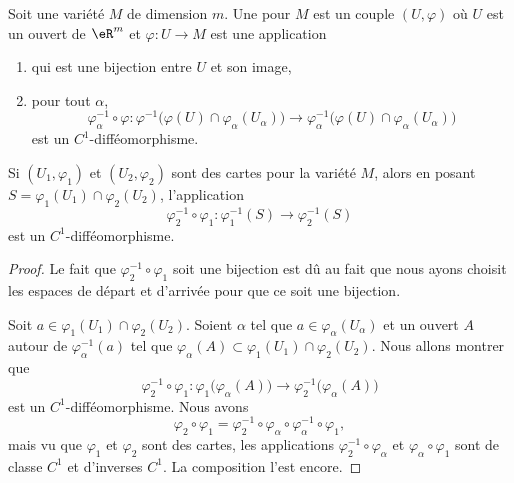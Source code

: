 \begin{definition}      \label{DEFooWABZooGIEDEV}
    Soit une variété \( M\) de dimension \( m\). Une  pour \( M\) est un couple \( (U,\varphi)\) où \( U\) est un ouvert de \( \eR^m\) et \( \varphi\colon U\to M\) est une application
    \begin{enumerate}
        \item
            qui est une bijection entre \( U\) et son image,
        \item
    pour tout \( \alpha\),
    \begin{equation}
        \varphi_{\alpha}^{-1}\circ \varphi\colon \varphi^{-1}\big( \varphi(U)\cap\varphi_{\alpha}(U_{\alpha}) \big)\to \varphi_{\alpha}^{-1}\big( \varphi(U)\cap\varphi_{\alpha}(U_{\alpha}) \big)
    \end{equation}
    est un \( C^1\)-difféomorphisme.
    \end{enumerate}
\end{definition}

\begin{proposition}
    Si \( (U_1,\varphi_1)\) et \( (U_2,\varphi_2)\) sont des cartes pour la variété \( M\), alors en posant \( S=\varphi_1(U_1)\cap \varphi_2(U_2)\), l'application
    \begin{equation}
        \varphi_2^{-1}\circ\varphi_1\colon \varphi_1^{-1}(S)\to \varphi_2^{-1}(S)
    \end{equation}
    est un \( C^1\)-difféomorphisme.
\end{proposition}

\begin{proof}
    Le fait que \( \varphi_2^{-1}\circ\varphi_1\) soit une bijection est dû au fait que nous ayons choisit les espaces de départ et d'arrivée pour que ce soit une bijection.

    Soit \( a\in \varphi_1(U_1)\cap\varphi_2(U_2)\). Soient \( \alpha\) tel que \( a\in\varphi_{\alpha}(U_{\alpha})\) et un ouvert \( A\) autour de \( \varphi_{\alpha}^{-1}(a)\) tel que \( \varphi_{\alpha}(A)\subset \varphi_1(U_1)\cap \varphi_2(U_2)\). Nous allons montrer que
    \begin{equation}
        \varphi_2^{-1}\circ \varphi_1\colon \varphi_1\big( \varphi_{\alpha}(A) \big)\to \varphi_2^{-1}\big( \varphi_{\alpha}(A) \big)
    \end{equation}
    est un \( C^1\)-difféomorphisme. Nous avons
    \begin{equation}
        \varphi_2\circ\varphi_1=\varphi_2^{-1}\circ\varphi_{\alpha}\circ\varphi_{\alpha}^{-1}\circ\varphi_1,
    \end{equation}
    mais vu que \( \varphi_1\) et \( \varphi_2\) sont des cartes, les applications \( \varphi_2^{-1}\circ\varphi_{\alpha}\) et \( \varphi_{\alpha}\circ \varphi_1\) sont de classe \( C^1\) et d'inverses \( C^1\). La composition l'est encore.
\end{proof}

